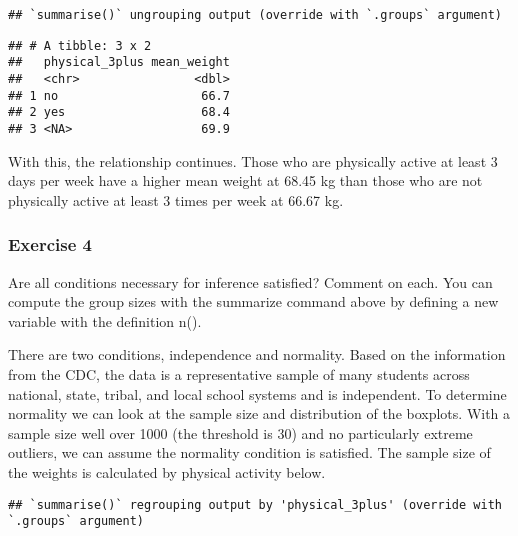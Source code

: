 \documentclass[
]{article}
\newenvironment{Shaded}{\begin{snugshade}}{\end{snugshade}}
\newcommand{\DataTypeTok}[1]{\textcolor[rgb]{0.13,0.29,0.53}{#1}}
\newcommand{\KeywordTok}[1]{\textcolor[rgb]{0.13,0.29,0.53}{\textbf{#1}}}
\newcommand{\NormalTok}[1]{#1}
\newcommand{\OperatorTok}[1]{\textcolor[rgb]{0.81,0.36,0.00}{\textbf{#1}}}
\newcommand{\StringTok}[1]{\textcolor[rgb]{0.31,0.60,0.02}{#1}}
\begin{document}
\begin{verbatim}
## `summarise()` ungrouping output (override with `.groups` argument)
\end{verbatim}

\begin{verbatim}
## # A tibble: 3 x 2
##   physical_3plus mean_weight
##   <chr>                <dbl>
## 1 no                    66.7
## 2 yes                   68.4
## 3 <NA>                  69.9
\end{verbatim}

With this, the relationship continues. Those who are physically active
at least 3 days per week have a higher mean weight at 68.45 kg than
those who are not physically active at least 3 times per week at 66.67
kg.

\hypertarget{exercise-4}{%
\subsubsection{Exercise 4}\label{exercise-4}}

Are all conditions necessary for inference satisfied? Comment on each.
You can compute the group sizes with the summarize command above by
defining a new variable with the definition n().

There are two conditions, independence and normality. Based on the
information from the CDC, the data is a representative sample of many
students across national, state, tribal, and local school systems and is
independent. To determine normality we can look at the sample size and
distribution of the boxplots. With a sample size well over 1000 (the
threshold is 30) and no particularly extreme outliers, we can assume the
normality condition is satisfied. The sample size of the weights is
calculated by physical activity below.

\begin{Shaded}
\end{Shaded}

\begin{verbatim}
## `summarise()` regrouping output by 'physical_3plus' (override with `.groups` argument)
\end{verbatim}
\end{document}
